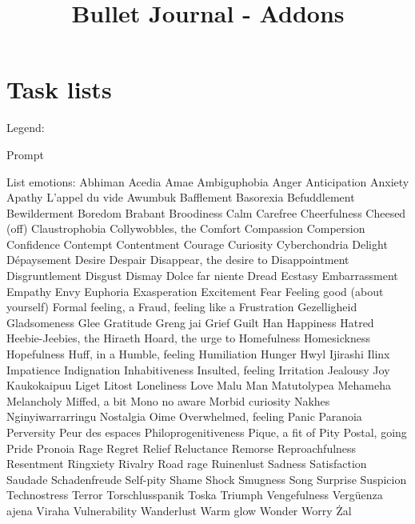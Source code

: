 \documentclass[10pt,a4paper]{article}
\title{Bullet Journal - Addons}
\begin{document}
\maketitle
\tableofcontents
\newpage
\section{Task lists}
Legend:
\begin{itemize}
	 [+] Prompt 
\end{itemize}
\newpage
List emotions:
	 Abhiman
	 Acedia
	 Amae
	 Ambiguphobia
	 Anger
	 Anticipation
	 Anxiety
	 Apathy
	 L’appel du vide
	 Awumbuk
	 Bafflement
	 Basorexia
	 Befuddlement
	 Bewilderment
	 Boredom
	 Brabant
	 Broodiness
	 Calm
	 Carefree
	 Cheerfulness
	 Cheesed (off)
	 Claustrophobia
	 Collywobbles, the
	 Comfort
	 Compassion
	 Compersion
	 Confidence
	 Contempt
	 Contentment
	 Courage
	 Curiosity
	 Cyberchondria
	 Delight
	 Dépaysement
	 Desire
	 Despair
	 Disappear, the desire to
	 Disappointment
	 Disgruntlement
	 Disgust
	 Dismay
	 Dolce far niente
	 Dread
	 Ecstasy
	 Embarrassment
	 Empathy
	 Envy
	 Euphoria
	 Exasperation
	 Excitement
	 Fear
	 Feeling good (about yourself)
	 Formal feeling, a
	 Fraud, feeling like a
	 Frustration
	 Gezelligheid
	 Gladsomeness
	 Glee
	 Gratitude
	 Greng jai
	 Grief
	 Guilt
	 Han
	 Happiness
	 Hatred
	 Heebie-Jeebies, the
	 Hiraeth
	 Hoard, the urge to
	 Homefulness
	 Homesickness
	 Hopefulness
	 Huff, in a
	 Humble, feeling
	 Humiliation
	 Hunger
	 Hwyl
	 Ijirashi
	 Ilinx
	 Impatience
	 Indignation
	 Inhabitiveness
	 Insulted, feeling
	 Irritation
	 Jealousy
	 Joy
	 Kaukokaipuu
	 Liget
	 Litost
	 Loneliness
	 Love
	 Malu
	 Man
	 Matutolypea
	 Mehameha
	 Melancholy
	 Miffed, a bit
	 Mono no aware
	 Morbid curiosity
	 Nakhes
	 Nginyiwarrarringu
	 Nostalgia
	 Oime
	 Overwhelmed, feeling
	 Panic
	 Paranoia
	 Perversity
	 Peur des espaces
	 Philoprogenitiveness
	 Pique, a fit of
	 Pity
	 Postal, going
	 Pride
	 Pronoia
	 Rage
	 Regret
	 Relief
	 Reluctance
	 Remorse
	 Reproachfulness
	 Resentment
	 Ringxiety
	 Rivalry
	 Road rage
	 Ruinenlust
	 Sadness
	 Satisfaction
	 Saudade
	 Schadenfreude
   Self-pity
	 Shame
	 Shock
	 Smugness
	 Song
	 Surprise
	 Suspicion
	 Technostress
	 Terror
	 Torschlusspanik
	 Toska
	 Triumph
	 Vengefulness
	 Vergüenza ajena
	 Viraha
	 Vulnerability
	 Wanderlust
 	 Warm glow
	 Wonder
	 Worry
	 Żal
\newpage
\end{document}
